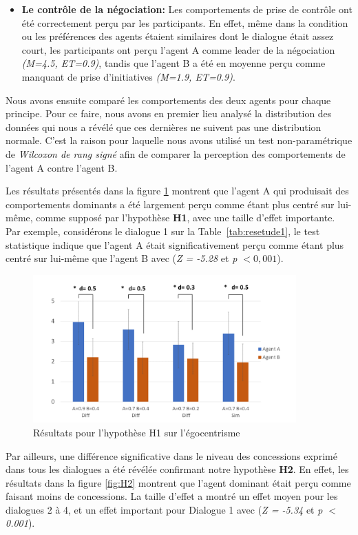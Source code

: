 {\begin{itemize}
							\item  \textbf{Le contrôle de la négociation:} Les comportements de prise de contrôle ont été correctement perçu par les participants. En effet, même dans la condition ou les préférences des agents étaient similaires dont le dialogue était assez court, les participants ont perçu l'agent A comme leader de la négociation \textit{(M=4.5, ET=0.9)}, tandis que l'agent B a été en moyenne perçu comme manquant de prise d'initiatives \textit{(M=1.9, ET=0.9)}.
					\end{itemize}
				
			Nous avons ensuite comparé les comportements des deux agents pour chaque principe. Pour ce faire, nous avons en premier lieu analysé la distribution des données qui nous a révélé que ces dernières ne suivent pas une distribution normale. C'est la raison pour laquelle nous avons utilisé un test non-paramétrique de \emph{Wilcoxon  de rang signé} afin de comparer la perception des comportements de l'agent A contre l'agent B.
			
			Les résultats présentés dans la figure \ref{fig:H1} montrent que l'agent A qui produisait des comportements dominants a été largement perçu comme étant plus centré sur lui-même, comme supposé par l'hypothèse \textbf {H1}, avec une taille d'effet importante. Par exemple, considérons le dialogue 1 sur la Table~\ref {tab:resetude1}, le test statistique indique que l'agent A était significativement perçu comme étant plus centré sur lui-même que l'agent B avec (\emph {Z = -5.28} et  \emph {p $ <0,001 $}).
				\begin{figure}[h]
				\includegraphics[width=0.9\textwidth, height= 0.25 \textheight]{Figures/chap4/AA/graphs/Diapositive1.PNG}
					\caption{Résultats pour l'hypothèse H1 sur l'égocentrisme \label{fig:H1}}
				\end{figure}	
			
			\par Par ailleurs, une différence significative dans le niveau des concessions exprimé dans tous les dialogues a été révélée confirmant notre hypothèse \textbf {H2}. En effet, les résultats dans la figure \ref{fig:H2} montrent que l'agent dominant était perçu comme faisant moins de concessions. La taille d'effet a montré un effet moyen pour les dialogues 2 à 4, et un effet important pour Dialogue 1 avec (\emph {Z = -5.34} et \emph {p $ <$ 0.001}).
			
}
